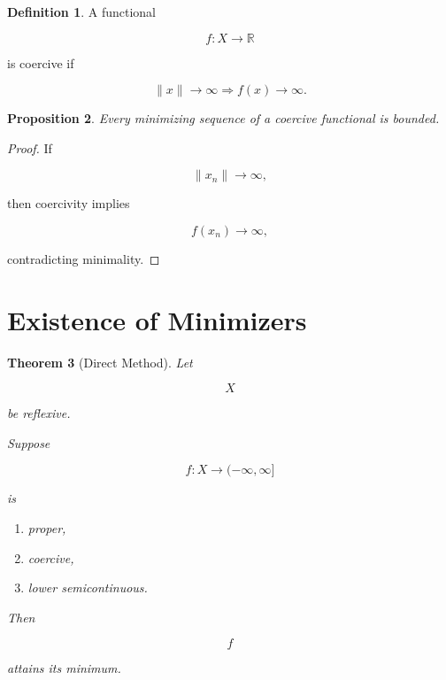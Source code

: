\documentclass[11pt]{book}
\numberwithin{equation}{chapter}
\theoremstyle{definition}
\newtheorem{definition}{Definition}[chapter]
\theoremstyle{plain}
\newtheorem{theorem}[definition]{Theorem}
\newtheorem{proposition}[definition]{Proposition}
\begin{document}
\begin{definition}

A functional

\[
f:X\rightarrow\mathbb R
\]

is coercive if

\[
\|x\|\rightarrow\infty
\Longrightarrow
f(x)\rightarrow\infty.
\]

\end{definition}


\begin{proposition}

Every minimizing sequence of a coercive functional is bounded.

\end{proposition}

\begin{proof}

If

\[
\|x_n\|\rightarrow\infty,
\]

then coercivity implies

\[
f(x_n)\rightarrow\infty,
\]

contradicting minimality.

\end{proof}


\section{Existence of Minimizers}

\begin{theorem}[Direct Method]

Let

\[
X
\]

be reflexive.

Suppose

\[
f:X\rightarrow(-\infty,\infty]
\]

is

\begin{enumerate}

\item proper,

\item coercive,

\item lower semicontinuous.

\end{enumerate}

Then

\[
f
\]

attains its minimum.

\end{theorem}
\end{document}
